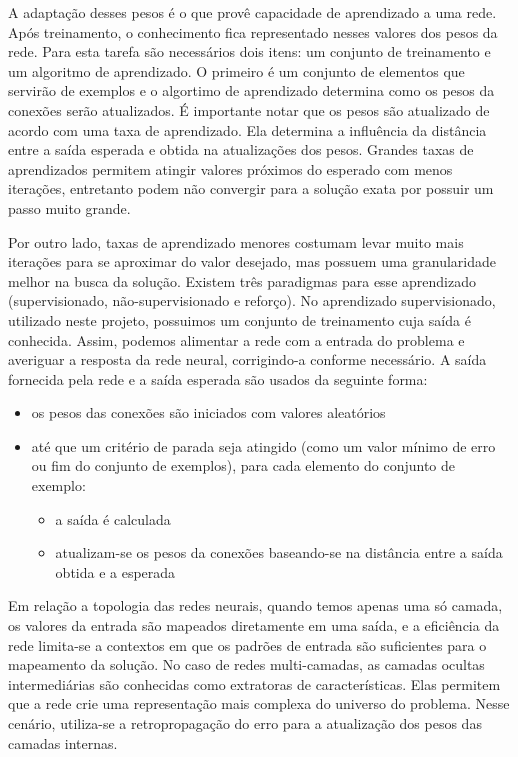 \documentclass[twoside,conference,a4paper]{IEEEtran}
\begin{document}
A adaptação desses pesos é o que provê capacidade de aprendizado a uma rede.
Após treinamento, o conhecimento fica representado nesses valores dos pesos da rede. Para esta tarefa são necessários dois itens: um conjunto de treinamento e um algoritmo de aprendizado. O primeiro é um conjunto de elementos que servirão de exemplos e o algortimo de aprendizado determina como os pesos da conexões serão atualizados. É importante notar que os pesos são atualizado de acordo com uma taxa de aprendizado. Ela determina a influência da distância entre a saída esperada e obtida na atualizações dos pesos. Grandes taxas de aprendizados permitem atingir valores próximos do esperado com menos iterações, entretanto podem não convergir para a solução exata por possuir um passo muito grande.

Por outro lado, taxas de aprendizado menores costumam levar muito mais iterações para se aproximar do valor desejado, mas possuem uma granularidade melhor na busca da solução. Existem três paradigmas para esse aprendizado (supervisionado, não-supervisionado e reforço). No aprendizado supervisionado, utilizado neste projeto, possuimos um conjunto de treinamento cuja saída é conhecida. Assim, podemos alimentar a rede com a entrada do problema e averiguar a resposta da rede neural, corrigindo-a conforme necessário. A saída fornecida pela rede e a saída esperada são usados da seguinte forma:
\begin{itemize}
\item os pesos das conexões são iniciados com valores aleatórios
\item até que um critério de parada seja atingido (como um valor mínimo de erro ou fim do conjunto de exemplos), para cada elemento do conjunto de exemplo:
  \begin{itemize}
    \item a saída é calculada
    \item atualizam-se os pesos da conexões baseando-se na distância entre a saída obtida e a esperada
  \end{itemize}
\end{itemize}

Em relação a topologia das redes neurais, quando temos apenas uma só camada, os valores da entrada são mapeados diretamente em uma saída, e a eficiência da rede limita-se a contextos em que os padrões de entrada são suficientes para o mapeamento da solução. No caso de redes multi-camadas, as camadas ocultas intermediárias são conhecidas como extratoras de características. Elas permitem que a rede crie uma representação mais complexa do universo do problema. Nesse cenário, utiliza-se a retropropagação do erro para a atualização dos pesos das camadas internas.
\end{document}
